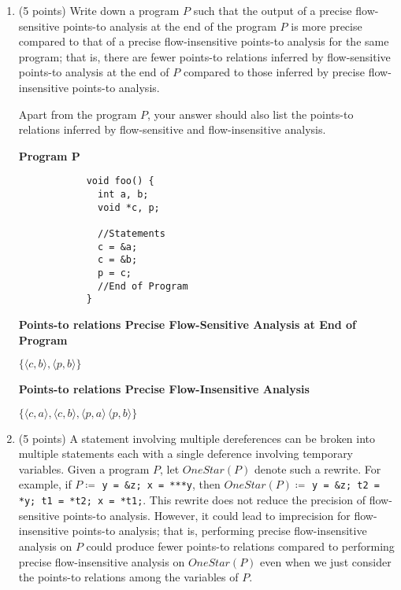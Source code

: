 \documentclass[12pt]{article}
\begin{document}
\begin{enumerate}
        \item (5 points) Write down a program $P$ such that the output of a precise
        flow-sensitive points-to analysis at the end of the program $P$ is more
        precise compared to that of a precise flow-insensitive points-to
        analysis for the same program; that is, there are fewer points-to relations 
        inferred by flow-sensitive points-to analysis at the end of $P$ compared 
        to those inferred by precise flow-insensitive points-to analysis.
        
        Apart from the program $P$, your answer should also list the points-to 
        relations inferred by flow-sensitive and flow-insensitive analysis.

        \begin{mdframed}
          \vspace{4em}
          \textbf{Program P}

          \begin{lstlisting}
            void foo() {
              int a, b;
              void *c, p;

              //Statements
              c = &a;
              c = &b;
              p = c;
              //End of Program
            }
          \end{lstlisting}
          \textbf{Points-to relations Precise Flow-Sensitive Analysis at End of Program}

          $\{\langle c, b\rangle,\langle p, b\rangle\}$

          \textbf{Points-to relations Precise Flow-Insensitive Analysis}
          
          $\{\langle c, a\rangle, \langle c, b\rangle,\langle p, a\rangle\, \langle p, b\rangle\}$
        \end{mdframed}

      \item (5 points) A statement involving multiple dereferences can be broken
      into multiple statements each with a single deference involving temporary
      variables. Given a program $P$, let $OneStar(P)$ denote such a rewrite.
      For example, if $P \coloneqq$ \lstinline$y = &z; x = ***y$, then
      $OneStar(P) \coloneqq $ \lstinline$y = &z; t2 = *y; t1 = *t2; x = *t1;$.
      This rewrite does not reduce the precision of flow-sensitive points-to
      analysis. However, it could lead to imprecision for flow-insensitive
      points-to analysis; that is, performing precise flow-insensitive analysis
      on $P$ could produce fewer points-to relations compared to performing
      precise flow-insensitive analysis on $OneStar(P)$ even when we just
      consider the points-to relations among the variables of $P$.


\end{enumerate}
\end{document}
